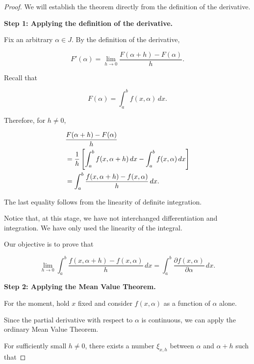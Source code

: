 \documentclass[11pt,a4paper]{article}
\theoremstyle{definition}
\theoremstyle{remark}
\begin{document}
\begin{proof}

We will establish the theorem
directly from the definition
of the derivative.

\medskip

\textbf{Step 1: Applying the definition
of the derivative.}

Fix an arbitrary $\alpha\in J$.
By the definition of the derivative,

\begin{equation}
    F'(\alpha)
    =
    \lim_{h\to0}
    \frac{F(\alpha+h)-F(\alpha)}{h}.
\end{equation}

Recall that

\[
    F(\alpha)
    =
    \int_a^b f(x,\alpha)\,dx.
\]

Therefore, for $h\neq0$,

\begin{align}
    &\frac{F(\alpha+h)-F(\alpha)}{h}
    \notag\\
    &=
    \frac{1}{h}
    \left[
    \int_a^b f(x,\alpha+h)\,dx
    -
    \int_a^b f(x,\alpha)\,dx
    \right]
    \notag\\
    &=
    \int_a^b
    \frac{f(x,\alpha+h)-f(x,\alpha)}
         {h}\,dx.
    \label{eq:leibniz_difference_quotient}
\end{align}

The last equality follows
from the linearity of
definite integration.

Notice that, at this stage,
we have not interchanged
differentiation and integration.
We have only used the linearity
of the integral.

Our objective is to prove that

\begin{equation}
    \lim_{h\to0}
    \int_a^b
    \frac{f(x,\alpha+h)-f(x,\alpha)}
         {h}\,dx
    =
    \int_a^b
    \frac{\partial f(x,\alpha)}
         {\partial\alpha}\,dx.
\end{equation}

\medskip

\textbf{Step 2: Applying the Mean Value Theorem.}

For the moment, hold $x$ fixed
and consider $f(x,\alpha)$
as a function of $\alpha$ alone.

Since the partial derivative
with respect to $\alpha$
is continuous, we can apply
the ordinary Mean Value Theorem.

For sufficiently small
$h\neq0$, there exists
a number $\xi_{x,h}$
between $\alpha$ and
$\alpha+h$ such that


\end{proof}
\end{document}
